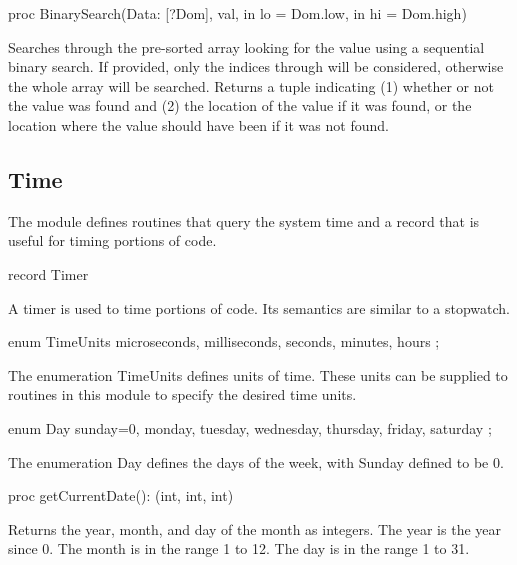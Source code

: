 \begin{protohead}
proc BinarySearch(Data: [?Dom], val, in lo = Dom.low, in hi = Dom.high)
\end{protohead}
\begin{protobody}
Searches through the pre-sorted array  looking for the
value  using a sequential binary search.  If provided, only
the indices  through  will be considered, otherwise
the whole array will be searched.  Returns a tuple indicating (1)
whether or not the value was found and (2) the location of the value
if it was found, or the location where the value should have been if
it was not found.
\end{protobody}


\subsection{Time}
\label{Time}

The module  defines routines that query the system time and
a record  that is useful for timing portions of code.

\vspace{1pc}

\begin{protohead}
record Timer
\end{protohead}
\begin{protobody}
A timer is used to time portions of code.  Its semantics are similar
to a stopwatch.
\end{protobody}

\begin{protohead}
enum TimeUnits { microseconds, milliseconds, seconds, minutes, hours };
\end{protohead}
\begin{protobody}
The enumeration TimeUnits defines units of time.  These units can be
supplied to routines in this module to specify the desired time units.
\end{protobody}

\begin{protohead}
enum Day { sunday=0, monday, tuesday, wednesday, thursday, friday, saturday };
\end{protohead}
\begin{protobody}
The enumeration Day defines the days of the week, with Sunday defined to be 0.
\end{protobody}

\begin{protohead}
proc getCurrentDate(): (int, int, int)
\end{protohead}
\begin{protobody}
Returns the year, month, and day of the month as integers.  The year
is the year since 0.  The month is in the range 1 to 12.  The day is
in the range 1 to 31.
\end{protobody}

